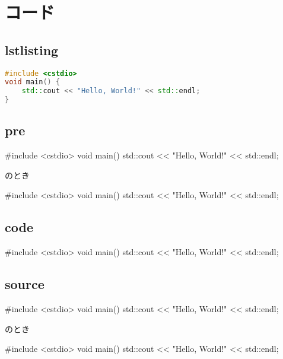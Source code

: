 \documentclass[../main]{subfiles}
\begin{document}
\setcounter{section}{3}
\section{コード}

\subsection{lstlisting}
\begin{lstlisting}[language=c++]
#include <cstdio>
void main() {
    std::cout << "Hello, World!" << std::endl;
}
\end{lstlisting}

\subsection{pre}
\begin{pre}[language=c++]
#include <cstdio>
void main() {
    std::cout << "Hello, World!" << std::endl;
}
\end{pre}

のとき

\begin{pre}[language=c++,numbers=left]
#include <cstdio>
void main() {
    std::cout << "Hello, World!" << std::endl;
}
\end{pre}

\subsection{code}
\begin{code}[language=c++]
#include <cstdio>
void main() {
    std::cout << "Hello, World!" << std::endl;
}
\end{code}

\subsection{source}
\begin{source}[language=c++]
#include <cstdio>
void main() {
    std::cout << "Hello, World!" << std::endl;
}
\end{source}

のとき

\begin{source}[language=c++,numbers=left]
#include <cstdio>
void main() {
    std::cout << "Hello, World!" << std::endl;
}
\end{source}
\end{document}

